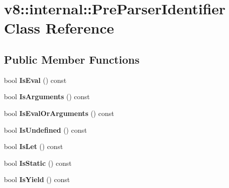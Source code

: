 \hypertarget{classv8_1_1internal_1_1_pre_parser_identifier}{}\section{v8\+:\+:internal\+:\+:Pre\+Parser\+Identifier Class Reference}
\label{classv8_1_1internal_1_1_pre_parser_identifier}
\subsection*{Public Member Functions}
\begin{DoxyCompactItemize}
\item 
bool {\bfseries Is\+Eval} () const \hypertarget{classv8_1_1internal_1_1_pre_parser_identifier_a8c7f8c1a4b57dc33168119ab82fdf3ee}{}\label{classv8_1_1internal_1_1_pre_parser_identifier_a8c7f8c1a4b57dc33168119ab82fdf3ee}

\item 
bool {\bfseries Is\+Arguments} () const \hypertarget{classv8_1_1internal_1_1_pre_parser_identifier_ad008a16e01f3cf6fbc53addfaefb18d9}{}\label{classv8_1_1internal_1_1_pre_parser_identifier_ad008a16e01f3cf6fbc53addfaefb18d9}

\item 
bool {\bfseries Is\+Eval\+Or\+Arguments} () const \hypertarget{classv8_1_1internal_1_1_pre_parser_identifier_a8ceda50a7b87f6dd5d84495176c620f3}{}\label{classv8_1_1internal_1_1_pre_parser_identifier_a8ceda50a7b87f6dd5d84495176c620f3}

\item 
bool {\bfseries Is\+Undefined} () const \hypertarget{classv8_1_1internal_1_1_pre_parser_identifier_a57e231febb876ff16aaf3e835c982eb0}{}\label{classv8_1_1internal_1_1_pre_parser_identifier_a57e231febb876ff16aaf3e835c982eb0}

\item 
bool {\bfseries Is\+Let} () const \hypertarget{classv8_1_1internal_1_1_pre_parser_identifier_aec67ed8cd52b8e296e319af280e7c4c7}{}\label{classv8_1_1internal_1_1_pre_parser_identifier_aec67ed8cd52b8e296e319af280e7c4c7}

\item 
bool {\bfseries Is\+Static} () const \hypertarget{classv8_1_1internal_1_1_pre_parser_identifier_aa9a24e00579514d7bb333354c0f07776}{}\label{classv8_1_1internal_1_1_pre_parser_identifier_aa9a24e00579514d7bb333354c0f07776}

\item 
bool {\bfseries Is\+Yield} () const \hypertarget{classv8_1_1internal_1_1_pre_parser_identifier_afbb58fce44a1620129122f616c724c67}{}\label{classv8_1_1internal_1_1_pre_parser_identifier_afbb58fce44a1620129122f616c724c67}


\end{DoxyCompactItemize}
